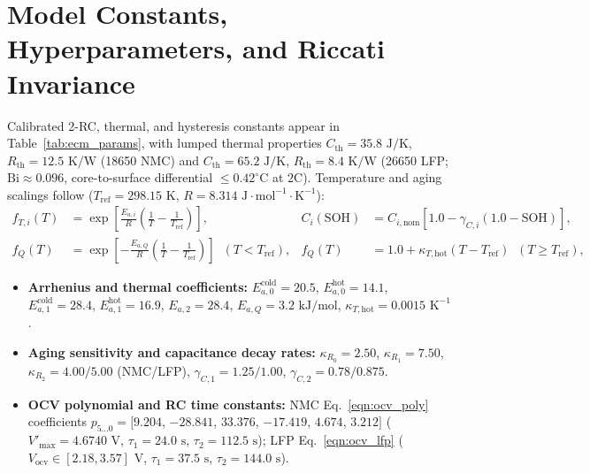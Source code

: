 \documentclass[10pt,a4paper]{article}
\begin{document}
\section{Model Constants, Hyperparameters, and Riccati Invariance\label{app:parameters}}
Calibrated 2-RC, thermal, and hysteresis constants appear in Table~\ref{tab:ecm_params}, with lumped thermal properties $C_{\text{th}} = 35.8\text{ J/K}$, $R_{\text{th}} = 12.5\text{ K/W}$ (18650 NMC) and $C_{\text{th}} = 65.2\text{ J/K}$, $R_{\text{th}} = 8.4\text{ K/W}$ (26650 LFP; $\text{Bi} \approx 0.096$, core-to-surface differential $\le 0.42^\circ\text{C}$ at $2\text{C}$). Temperature and aging scalings follow ($T_{\text{ref}} = 298.15\text{ K}$, $R = 8.314\text{ J}\cdot\text{mol}^{-1}\cdot\text{K}^{-1}$):
\begin{align*}
f_{T,i}(T) &= \exp\!\left[\frac{E_{a,i}}{R}\left(\frac{1}{T} - \frac{1}{T_{\text{ref}}}\right)\right], &
C_i(\text{SOH}) &= C_{i,\text{nom}}\left[1.0 - \gamma_{C,i}(1.0 - \text{SOH})\right], \\
f_Q(T) &= \exp\!\left[-\frac{E_{a,Q}}{R}\left(\frac{1}{T} - \frac{1}{T_{\text{ref}}}\right)\right] \;\; (T < T_{\text{ref}}), &
f_Q(T) &= 1.0 + \kappa_{T,\text{hot}}(T - T_{\text{ref}}) \;\; (T \ge T_{\text{ref}}),
\end{align*}
\begin{itemize}[itemsep=1pt,topsep=2pt]
\item \textbf{Arrhenius and thermal coefficients:} $E_{a,0}^{\text{cold}} = 20.5$, $E_{a,0}^{\text{hot}} = 14.1$, $E_{a,1}^{\text{cold}} = 28.4$, $E_{a,1}^{\text{hot}} = 16.9$, $E_{a,2} = 28.4$, $E_{a,Q} = 3.2\text{ kJ/mol}$, $\kappa_{T,\text{hot}} = 0.0015\text{ K}^{-1}$.
\item \textbf{Aging sensitivity and capacitance decay rates:} $\kappa_{R_0} = 2.50$, $\kappa_{R_1} = 7.50$, $\kappa_{R_2} = 4.00/5.00$ (NMC/LFP), $\gamma_{C,1} = 1.25/1.00$, $\gamma_{C,2} = 0.78/0.875$.
\item \textbf{OCV polynomial and RC time constants:} NMC Eq.~\eqref{eqn:ocv_poly} coefficients $p_{5\dots 0} = [9.204$, $-28.841$, $33.376$, $-17.419$, $4.674$, $3.212]$ ($V'_{\max} = 4.6740\text{ V}$, $\tau_1 = 24.0\text{ s}$, $\tau_2 = 112.5\text{ s}$); LFP Eq.~\eqref{eqn:ocv_lfp} ($V_{\text{ocv}} \in [2.18, 3.57]\text{ V}$, $\tau_1 = 37.5\text{ s}$, $\tau_2 = 144.0\text{ s}$).
\end{itemize}
\end{document}
